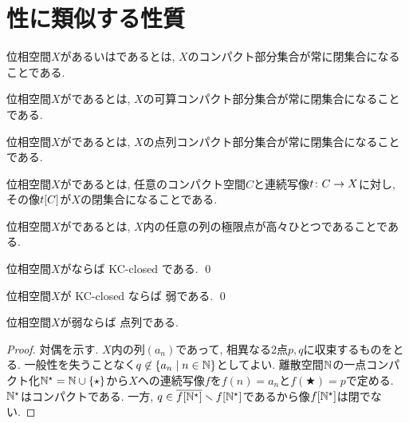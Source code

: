 \documentclass[uplatex, dvipdfmx, a4paper, 12pt, class=jsbook, crop=false]{standalone}
\begin{document}
\section{\Hausdorff 性に類似する性質}
\label{sec:Hausdorff-like-properties}

\begin{definition}
	位相空間$ X $があるいはであるとは, $ X $のコンパクト部分集合が常に閉集合になることである.
\end{definition}

\begin{definition}
	位相空間$ X $がであるとは, $ X $の可算コンパクト部分集合が常に閉集合になることである.
\end{definition}

\begin{definition}
	位相空間$ X $がであるとは, $ X $の点列コンパクト部分集合が常に閉集合になることである.
\end{definition}

\begin{definition}
	位相空間$ X $がであるとは,
	任意のコンパクト\Hausdorff 空間$ C $と連続写像$ t\colon C\to X $に対し,
	その像$ \mapset{t}{C} $が$ X $の閉集合になることである.
\end{definition}

\begin{definition}
	位相空間$ X $がであるとは, $ X $内の任意の列の極限点が高々ひとつであることである.
\end{definition}

\begin{proposition}
	\label{whaus00001}
	位相空間$X$が\Hausdorff ならば KC-closed である.
	\qed
\end{proposition}

\begin{proposition}
	位相空間$X$が KC-closed ならば 弱\Hausdorff である.
	\qed
\end{proposition}

\begin{proposition}
	位相空間$X$が弱\Hausdorff ならば 点列\Hausdorff である.
\end{proposition}

\begin{proof}
	対偶を示す.
	$X$内の列$(a_n)$であって, 相異なる2点$p, q$に収束するものをとる.
	一般性を失うことなく$q \not\in \setcomp{a_n}{n \in \N}$としてよい.
	離散空間$\mathbb{N}$の一点コンパクト化$\mathbb{N}^\star = \mathbb{N} \cup \{\star\}$から$X$への連続写像$f$を$f(n) = a_n$と$f(\bigstar) = p$で定める.
	$\mathbb{N}^\star$はコンパクト\Hausdorff である.
	一方, $q \in \overline{f[\mathbb{N}^\star]} \smallsetminus f[\mathbb{N}^\star]$であるから像$f[\mathbb{N}^\star]$は閉でない.
\end{proof}
\end{document}
